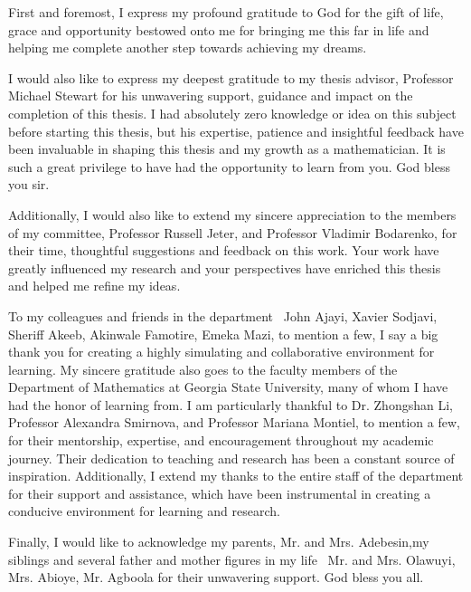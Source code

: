 First and foremost, I express my profound gratitude to God for the gift of life, grace and opportunity bestowed onto me for bringing me this far in life and helping me complete another step towards achieving my dreams.

I would also like to express my deepest gratitude to my thesis advisor, Professor Michael Stewart for his unwavering support, guidance and impact on the completion of this thesis. I had absolutely zero knowledge or idea on this subject before starting this thesis, but his expertise, patience and insightful feedback have been invaluable in shaping this thesis and my growth as a mathematician. It is such a great privilege to have had the opportunity to learn from you. God bless you sir.

Additionally, I would also like to extend my sincere appreciation to the members of my committee, Professor Russell Jeter, and Professor Vladimir Bodarenko, for their time, thoughtful suggestions and feedback on this work. Your work have greatly influenced my research and your perspectives have enriched this thesis and helped me refine my ideas.

To my colleagues and friends in the department \textemdash\, John Ajayi, Xavier Sodjavi, Sheriff Akeeb, Akinwale Famotire, Emeka Mazi, to mention a few, I say a big thank you for creating a highly simulating and collaborative environment for learning. My sincere gratitude also goes to the faculty members of the Department of Mathematics at Georgia State University, many of whom I have had the honor of learning from. I am particularly thankful to Dr. Zhongshan Li, Professor Alexandra Smirnova, and Professor Mariana Montiel, to mention a few, for their mentorship, expertise, and encouragement throughout my academic journey. Their dedication to teaching and research has been a constant source of inspiration. Additionally, I extend my thanks to the entire staff of the department for their support and assistance, which have been instrumental in creating a conducive environment for learning and research.

Finally, I would like to acknowledge my parents, Mr. and Mrs. Adebesin,my siblings and several father and mother figures in my life \textemdash\, Mr. and Mrs. Olawuyi, Mrs. Abioye, Mr. Agboola for their unwavering support. God bless you all.


